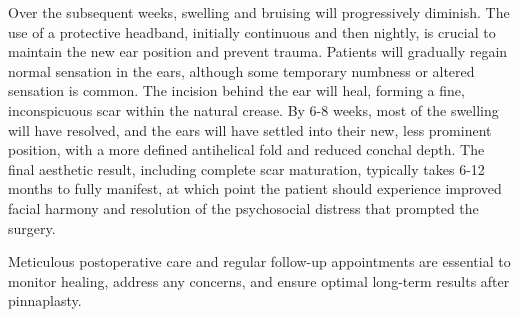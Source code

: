Over the subsequent weeks, swelling and bruising will progressively diminish. The use of a protective headband, initially continuous and then nightly, is crucial to maintain the new ear position and prevent trauma. Patients will gradually regain normal sensation in the ears, although some temporary numbness or altered sensation is common. The incision behind the ear will heal, forming a fine, inconspicuous scar within the natural crease. By 6-8 weeks, most of the swelling will have resolved, and the ears will have settled into their new, less prominent position, with a more defined antihelical fold and reduced conchal depth. The final aesthetic result, including complete scar maturation, typically takes 6-12 months to fully manifest, at which point the patient should experience improved facial harmony and resolution of the psychosocial distress that prompted the surgery.

Meticulous postoperative care and regular follow-up appointments are essential to monitor healing, address any concerns, and ensure optimal long-term results after pinnaplasty.

